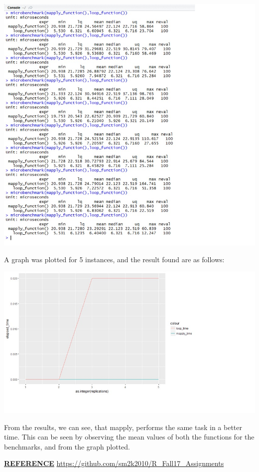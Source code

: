 \documentclass{article}
\begin{document}
	\begin{center}
		\includegraphics{benchmark_mapply.jpg}
	\end{center}
	
 
   A graph was plotted for 5 instances, and the result found are as follows:
   
    \begin{center}
    	\includegraphics{plot_mapply.jpg}
    \end{center}
    From the results, we can see, that mapply, performs the same task in a better time. This can be seen by observing the mean values of both the functions for the benchmarks, and from the graph plotted.
    \linebreak
    
    \underline{\textbf{REFERENCE}}
    \linebreak
	\url{https://github.com/sm2k2010/R_Fall17_Assignments}
\end{document}
